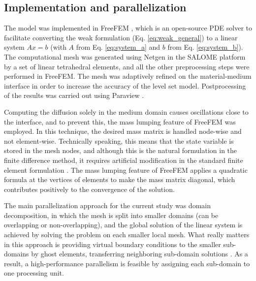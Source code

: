 \subsection{Implementation and parallelization}

The model was implemented in FreeFEM \cite{Hecht2012}, which is an open-source {PDE} solver to facilitate converting the weak formulation (Eq. \ref{eq:weak_general}) to a linear system $Ax=b$ (with $A$ from Eq. \ref{eq:system_a} and $b$ from Eq. \ref{eq:system_b}). The computational mesh was generated using Netgen \cite{Schoeberl1997} in the SALOME platform \cite{Ribes2007} by a set of linear tetrahedral elements, and all the other preprocessing steps were performed in FreeFEM. The mesh was adaptively refined on the material-medium interface in order to increase the accuracy of the level set model. Postprocessing of the results was carried out using  Paraview \cite{Ahrens2005}.

Computing the diffusion solely in the medium domain causes oscillations close to the interface, and to prevent this, the mass lumping feature of FreeFEM was employed. In this technique, the desired mass matrix is handled node-wise and not element-wise. Technically speaking, this means that the state variable is stored in the mesh nodes, and although this is the natural formulation in the finite difference method, it requires artificial modification in the standard finite element formulation \cite{Wendland2005}. The mass lumping feature of FreeFEM applies a quadratic formula at the vertices of elements to make the mass matrix diagonal, which contributes positively to the convergence of the solution.


The main parallelization approach for the current study was domain decomposition, in which the mesh is split into smaller domains (can be overlapping or non-overlapping), and the global solution of the linear system is achieved by solving the problem on each smaller local mesh. What really matters in this approach is providing virtual boundary conditions to the smaller sub-domains by ghost elements, transferring neighboring sub-domain solutions \cite{Badri2018}. As a result, a high-performance parallelism is feasible by assigning each sub-domain to one processing unit.

